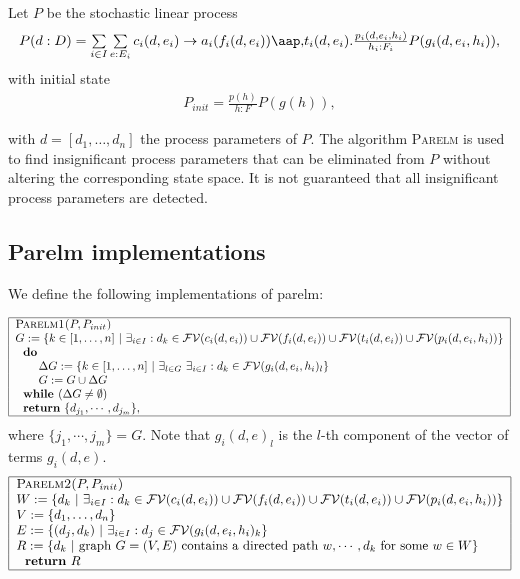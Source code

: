                       

Let $P$ be the stochastic linear process%
\[
\begin{array}{l}
P(d:D)=\sum\limits_{i\in I}\sum\limits_{e:E_{i}}c_{i}(d,e_{i})\rightarrow
a_{i}(f_{i}(d,e_{i}))\at t_{i}(d,e_{i}).\frac{p_{i}(d,e_{i},h_{i})}{%
h_{i}:F_{i}}P(g_{i}(d,e_{i},h_{i})),%
\end{array}%
\]%
with initial state%
\[
\begin{array}{l}
P_{init}=\frac{p(h)}{h:F}P(g(h)),%
\end{array}%
\]

with $d=[d_{1},\ldots ,d_{n}]$ the process parameters of $P$. The algorithm 
\textsc{Parelm} is used to find insignificant process parameters that can be
eliminated from $P$ without altering the corresponding state space. It is
not guaranteed that all insignificant process parameters are detected.

\subsection{Parelm implementations}

We define the following implementations of parelm:

\[
\begin{tabular}{|l|}
\hline
\textsc{Parelm1(}$P,P_{init}$\textsc{)} \\ 
$G:=\{k\in \lbrack 1,\ldots ,n]\ |\ \exists _{i\in I}:d_{k}\in \mathcal{FV}%
(c_{i}(d,e_{i}))\cup \mathcal{FV}(f_{i}(d,e_{i}))\cup \mathcal{FV}%
(t_{i}(d,e_{i}))\cup \mathcal{FV}(p_{i}(d,e_{i},h_{i}))\}$ \\ 
$\text{\textbf{do}}$ \\ 
$\qquad \Delta G:=\{k\in \lbrack 1,\ldots ,n]\ |\ \exists _{l\in G}\ \exists
_{i\in I}:d_{k}\in \mathcal{FV}(g_{i}(d,e_{i},h_{i})_{l}\}$ \\ 
$\qquad G:=G\cup \Delta G$ \\ 
$\text{\textbf{while }}(\Delta G\neq \emptyset )$ \\ 
$\text{\textbf{return} }\{d_{j_{1}},\cdots ,d_{j_{m}}\},$ \\ \hline
\end{tabular}%
\]%
where $\{j_{1},\cdots ,j_{m}\}=G$. Note that $g_{i}(d,e)_{l}$ is the $l$-th
component of the vector of terms $g_{i}(d,e)$.%
\[
\begin{tabular}{|l|}
\hline
\textsc{Parelm2(}$P,P_{init}$\textsc{)} \\ 
$W:=\{d_{k}\ |\ \exists _{i\in I}:d_{k}\in \mathcal{FV}(c_{i}(d,e_{i}))\cup 
\mathcal{FV}(f_{i}(d,e_{i}))\cup \mathcal{FV}(t_{i}(d,e_{i}))\cup \mathcal{FV%
}(p_{i}(d,e_{i},h_{i}))\}$ \\ 
$V:=\{d_{1},\ldots ,d_{n}\}$ \\ 
$E:=\{(d_{j},d_{k})\ |\ \exists _{i\in I}:d_{j}\in \mathcal{FV}%
(g_{i}(d,e_{i},h_{i})_{k}\}$ \\ 
$R:=\{d_{k}\ |\ $graph $G=(V,E)$ contains a directed path $w,\cdots ,d_{k}$
for some $w\in W\}$ \\ 
$\text{\textbf{return} }R$ \\ \hline
\end{tabular}%
\]%
\newpage 
